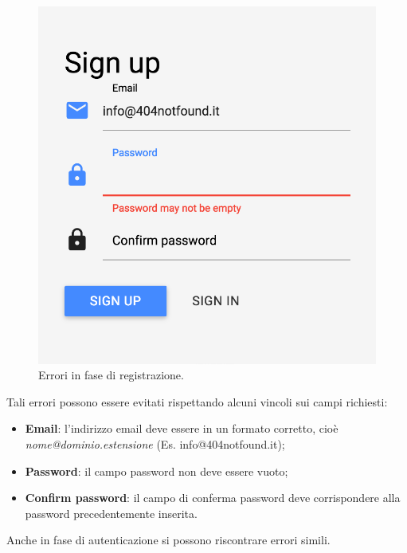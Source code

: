 \begin{figure}[!h]
\begin{center}
\includegraphics[scale=0.4]{img/signup_error2.png}
\caption{Errori in fase di registrazione.}
\end{center}
\end{figure}

Tali errori possono essere evitati rispettando alcuni vincoli sui campi richiesti:
\begin{itemize}
\item \textbf{Email}: l'indirizzo email deve essere in un formato corretto, cioè \emph{nome@dominio.estensione} (Es. info@404notfound.it);
\item \textbf{Password}: il campo password non deve essere vuoto;
\item \textbf{Confirm password}: il campo di conferma password deve corrispondere alla password precedentemente inserita.
\end{itemize}
\newpage
Anche in fase di autenticazione si possono riscontrare errori simili.\\

